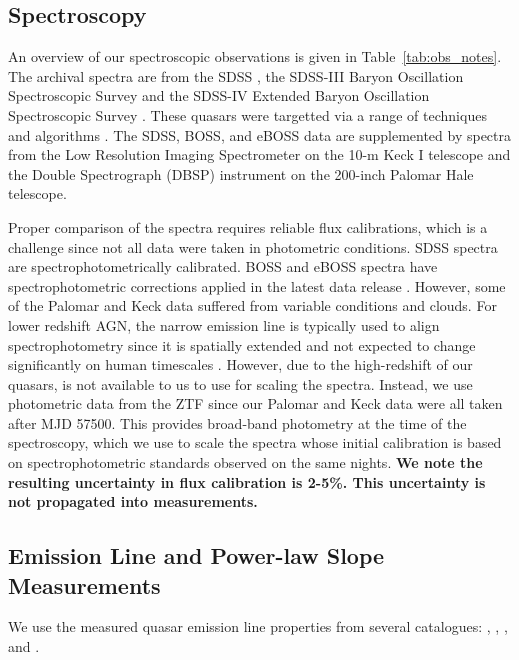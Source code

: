 \documentclass[fleqn,usenatbib]{mnras}
\begin{document}


\subsection{Spectroscopy}
An overview of our spectroscopic observations is given in
Table~\ref{tab:obs_notes}.  The archival spectra are from the SDSS
\citep{Stoughton2002, DR7, Schneider2010}, the SDSS-III Baryon
Oscillation Spectroscopic Survey \citep[BOSS; ][]{Eisenstein2011,
Dawson2013, Smee2013, Alam2015, Paris2017} and the SDSS-IV Extended
Baryon Oscillation Spectroscopic Survey \citep[eBOSS; ][]{Dawson2016,
Abolfathi2018, Paris2018}.  These quasars were targetted via a range
of techniques and algorithms \citep[see][]{Richards2002, Ross2012,
Myers2015}. The SDSS, BOSS, and eBOSS data are supplemented by spectra
from the Low Resolution Imaging Spectrometer \citep[LRIS; ][]{Oke1995}
on the 10-m Keck {\sc I} telescope and the Double Spectrograph (DBSP)
instrument on the 200-inch Palomar Hale telescope.

Proper comparison of the spectra requires reliable flux calibrations,
which is a challenge since not all data were taken in photometric
conditions.  SDSS spectra are spectrophotometrically calibrated.  BOSS
and eBOSS spectra have spectrophotometric corrections applied in the
latest data release \citep{Hutchinson2016, Jensen2016, Margala2016}.
However, some of the Palomar and Keck data suffered from variable
conditions and clouds.  For lower redshift AGN, the narrow \oiii
emission line is typically used to align spectrophotometry since it is
spatially extended and not expected to change significantly on human
timescales \citep[e.g.,][]{Barth2011}. However, due to the
high-redshift of our quasars, \oiii is not available to us to use for
scaling the spectra.  Instead, we use photometric data from the ZTF
since our Palomar and Keck data were all taken after MJD 57500.  This
provides broad-band photometry at the time of the spectroscopy, which
we use to scale the spectra whose initial calibration is based on
spectrophotometric standards observed on the same nights.  {\bf We
note the resulting uncertainty in flux calibration is 2-5\%.  This
uncertainty is not propagated into measurements.}


\subsection{Emission Line and Power-law Slope Measurements}
We use the measured quasar emission line properties from several
catalogues: \citet{Shen2011}, \citet{Hamann2017},
\citet{Kozlowski2017}, and \citet{Calderone2017}.
\end{document}

